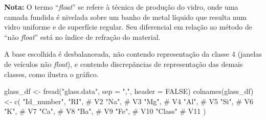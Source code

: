 \documentclass[
  letterpaper,
  DIV=11,
  numbers=noendperiod]{scrartcl}
\newenvironment{Shaded}{\begin{snugshade}}{\end{snugshade}}
\newcommand{\AttributeTok}[1]{\textcolor[rgb]{0.40,0.45,0.13}{#1}}
\newcommand{\CommentTok}[1]{\textcolor[rgb]{0.37,0.37,0.37}{#1}}
\newcommand{\ConstantTok}[1]{\textcolor[rgb]{0.56,0.35,0.01}{#1}}
\newcommand{\FunctionTok}[1]{\textcolor[rgb]{0.28,0.35,0.67}{#1}}
\newcommand{\NormalTok}[1]{\textcolor[rgb]{0.00,0.23,0.31}{#1}}
\newcommand{\OtherTok}[1]{\textcolor[rgb]{0.00,0.23,0.31}{#1}}
\newcommand{\StringTok}[1]{\textcolor[rgb]{0.13,0.47,0.30}{#1}}
\begin{document}
\textbf{Nota:} O termo ``\emph{float}'' se refere à técnica de produção
do vidro, onde uma camada fundida é nivelada sobre um banho de metal
líquido que resulta num vidro uniforme e de superfície regular. Seu
diferencial em relação ao método de ``não \emph{float}'' está no índice
de refração do material.

A base escolhida é desbalanceada, não contendo representação da classe 4
(janelas de veículos não \emph{float}), e contendo discrepâncias de
representação das demais classes, como ilustra o gráfico.

\begin{Shaded}
\begin{Highlighting}[]
\NormalTok{glass\_df }\OtherTok{\textless{}{-}} \FunctionTok{fread}\NormalTok{(}\StringTok{"glass.data"}\NormalTok{, }\AttributeTok{sep =} \StringTok{","}\NormalTok{, }\AttributeTok{header =} \ConstantTok{FALSE}\NormalTok{)}
\FunctionTok{colnames}\NormalTok{(glass\_df) }\OtherTok{\textless{}{-}} \FunctionTok{c}\NormalTok{(}
  \StringTok{"Id\_number"}\NormalTok{,}
  \StringTok{"RI"}\NormalTok{,  }\CommentTok{\# V2}
  \StringTok{"Na"}\NormalTok{,               }\CommentTok{\# V3}
  \StringTok{"Mg"}\NormalTok{,               }\CommentTok{\# V4}
  \StringTok{"Al"}\NormalTok{,               }\CommentTok{\# V5}
  \StringTok{"Si"}\NormalTok{,               }\CommentTok{\# V6}
  \StringTok{"K"}\NormalTok{,                }\CommentTok{\# V7}
  \StringTok{"Ca"}\NormalTok{,               }\CommentTok{\# V8}
  \StringTok{"Ba"}\NormalTok{,               }\CommentTok{\# V9}
  \StringTok{"Fe"}\NormalTok{,               }\CommentTok{\# V10}
  \StringTok{"Class"}             \CommentTok{\# V11}
\NormalTok{)}


\end{Highlighting}
\end{Shaded}
\end{document}
